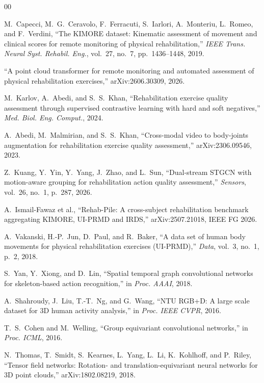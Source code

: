 \documentclass[11pt]{article}
\begin{document}
\begin{thebibliography}{00}

M.~Capecci, M.~G.~Ceravolo, F.~Ferracuti, S.~Iarlori, A.~Monteriu, L.~Romeo, and F.~Verdini,
``The KIMORE dataset: Kinematic assessment of movement and clinical scores for remote monitoring of physical rehabilitation,''
\textit{IEEE Trans. Neural Syst. Rehabil. Eng.}, vol.~27, no.~7, pp.~1436--1448, 2019.

``A point cloud transformer for remote monitoring and automated assessment of physical rehabilitation exercises,''
arXiv:2606.30309, 2026.

M.~Karlov, A.~Abedi, and S.~S.~Khan,
``Rehabilitation exercise quality assessment through supervised contrastive learning with hard and soft negatives,''
\textit{Med. Biol. Eng. Comput.}, 2024.

A.~Abedi, M.~Malmirian, and S.~S.~Khan,
``Cross-modal video to body-joints augmentation for rehabilitation exercise quality assessment,''
arXiv:2306.09546, 2023.

Z.~Kuang, Y.~Yin, Y.~Yang, J.~Zhao, and L.~Sun,
``Dual-stream STGCN with motion-aware grouping for rehabilitation action quality assessment,''
\textit{Sensors}, vol.~26, no.~1, p.~287, 2026.

A.~Ismail-Fawaz et al.,
``Rehab-Pile: A cross-subject rehabilitation benchmark aggregating KIMORE, UI-PRMD and IRDS,''
arXiv:2507.21018, IEEE FG 2026.

A.~Vakanski, H.-P.~Jun, D.~Paul, and R.~Baker,
``A data set of human body movements for physical rehabilitation exercises (UI-PRMD),''
\textit{Data}, vol.~3, no.~1, p.~2, 2018.

S.~Yan, Y.~Xiong, and D.~Lin,
``Spatial temporal graph convolutional networks for skeleton-based action recognition,''
in \textit{Proc. AAAI}, 2018.

A.~Shahroudy, J.~Liu, T.-T.~Ng, and G.~Wang,
``NTU RGB+D: A large scale dataset for 3D human activity analysis,''
in \textit{Proc. IEEE CVPR}, 2016.

T.~S.~Cohen and M.~Welling,
``Group equivariant convolutional networks,''
in \textit{Proc. ICML}, 2016.

N.~Thomas, T.~Smidt, S.~Kearnes, L.~Yang, L.~Li, K.~Kohlhoff, and P.~Riley,
``Tensor field networks: Rotation- and translation-equivariant neural networks for 3D point clouds,''
arXiv:1802.08219, 2018.


\end{thebibliography}
\end{document}
